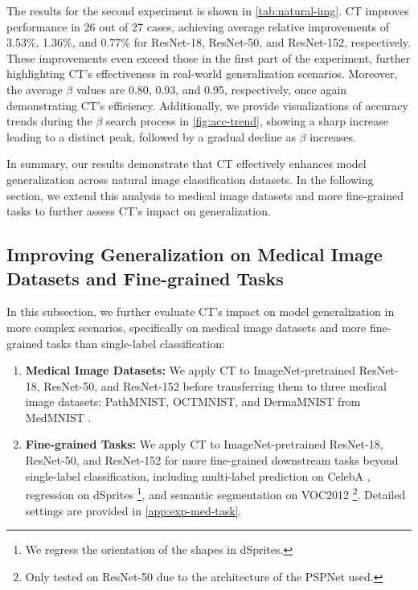 The results for the second experiment is shown in \cref{tab:natural-img}. CT improves performance in 26 out of 27 cases, achieving average relative improvements of 3.53\%, 1.36\%, and 0.77\% for ResNet-18, ResNet-50, and ResNet-152, respectively. These improvements even exceed those in the first part of the experiment, further highlighting CT’s effectiveness in real-world generalization scenarios. Moreover, the average $\beta$ values are 0.80, 0.93, and 0.95, respectively, once again demonstrating CT’s efficiency. Additionally, we provide visualizations of accuracy trends during the $\beta$ search process in \cref{fig:acc-trend}, showing a sharp increase leading to a distinct peak, followed by a gradual decline as $\beta$ increases.

In summary, our results demonstrate that CT effectively enhances model generalization across natural image classification datasets. In the following section, we extend this analysis to medical image datasets and more fine-grained tasks to further assess CT’s impact on generalization.

\subsection{Improving Generalization on Medical Image Datasets and Fine-grained Tasks}\label{sec:exp-med-task}
In this subsection, we further evaluate CT’s impact on model generalization in more complex scenarios, specifically on medical image datasets and more fine-grained tasks than single-label classification:

\begin{enumerate}
    \item \textbf{Medical Image Datasets:} We apply CT to ImageNet-pretrained ResNet-18, ResNet-50, and ResNet-152 before transferring them to three medical image datasets: PathMNIST, OCTMNIST, and DermaMNIST from MedMNIST \cite{yang2023medmnistv2}.\item \textbf{Fine-grained Tasks: } We apply CT to ImageNet-pretrained ResNet-18, ResNet-50, and ResNet-152 for more fine-grained downstream tasks beyond single-label classification, including multi-label prediction on CelebA \cite{liu2015celeba}, regression on dSprites \cite{Matthey2017dsprites}\footnote{We regress the orientation of the shapes in dSprites.}, and semantic segmentation on VOC2012 \cite{everingham2012voc}\footnote{Only tested on ResNet-50 due to the architecture of the PSPNet used.}. Detailed settings are provided in \cref{app:exp-med-task}.
\end{enumerate}


